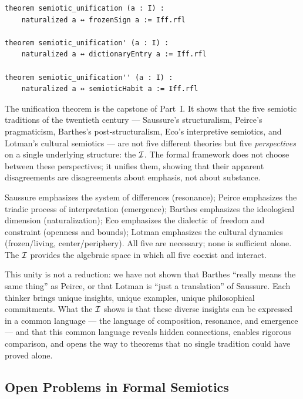 \begin{lstlisting}[caption={The semiotic unification theorem}]
theorem semiotic_unification (a : I) :
    naturalized a ↔ frozenSign a := Iff.rfl

theorem semiotic_unification' (a : I) :
    naturalized a ↔ dictionaryEntry a := Iff.rfl

theorem semiotic_unification'' (a : I) :
    naturalized a ↔ semioticHabit a := Iff.rfl
\end{lstlisting}

\begin{interpretation}
The unification theorem is the capstone of Part~I. It shows that the
five semiotic traditions of the twentieth century --- Saussure's
structuralism, Peirce's pragmaticism, Barthes's post-structuralism,
Eco's interpretive semiotics, and Lotman's cultural semiotics --- are
not five different theories but five \emph{perspectives} on a single
underlying structure: the $\mathcal{I}$. The formal framework does not choose
between these perspectives; it unifies them, showing that their
apparent disagreements are disagreements about emphasis, not about
substance.

Saussure emphasizes the system of differences (resonance); Peirce
emphasizes the triadic process of interpretation (emergence); Barthes
emphasizes the ideological dimension (naturalization); Eco emphasizes
the dialectic of freedom and constraint (openness and bounds); Lotman
emphasizes the cultural dynamics (frozen/living, center/periphery).
All five are necessary; none is sufficient alone. The $\mathcal{I}$ provides
the algebraic space in which all five coexist and interact.

This unity is not a reduction: we have not shown that Barthes ``really
means the same thing'' as Peirce, or that Lotman is ``just a
translation'' of Saussure. Each thinker brings unique insights, unique
examples, unique philosophical commitments. What the $\mathcal{I}$ shows is
that these diverse insights can be expressed in a common language ---
the language of composition, resonance, and emergence --- and that this
common language reveals hidden connections, enables rigorous comparison,
and opens the way to theorems that no single tradition could have
proved alone.
\end{interpretation}

\subsection{Open Problems in Formal Semiotics}

